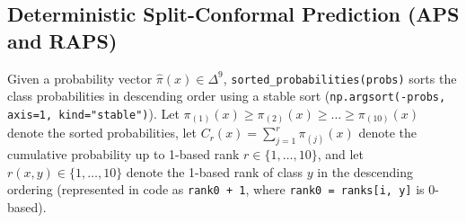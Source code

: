 \documentclass[11pt,a4paper]{article}
\begin{document}
\subsection{Deterministic Split-Conformal Prediction (APS and RAPS)}
Given a probability vector $\hat{\pi}(x) \in \Delta^9$, \texttt{sorted\_\allowbreak{}probabilities(probs)} sorts the class probabilities in descending order using a stable sort (\texttt{np.argsort(-probs, axis=1, kind="stable")}). Let $\pi_{(1)}(x) \ge \pi_{(2)}(x) \ge \dots \ge \pi_{(10)}(x)$ denote the sorted probabilities, let $C_r(x) = \sum_{j=1}^{r} \pi_{(j)}(x)$ denote the cumulative probability up to 1-based rank $r \in \{1, \dots, 10\}$, and let $r(x, y) \in \{1, \dots, 10\}$ denote the 1-based rank of class $y$ in the descending ordering (represented in code as \texttt{rank0 + 1}, where \texttt{rank0 = ranks[i, y]} is 0-based).
\end{document}
